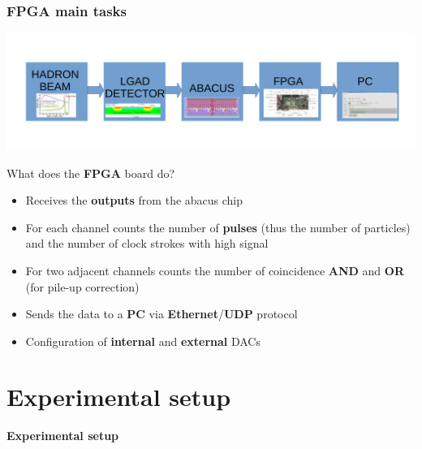 \documentclass[aspectratio=169]{beamer}
\begin{document}
\begin{frame}
	\frametitle{FPGA main tasks}
	\vspace*{-2.7mm}
	\begin{center}
		\includegraphics[width=0.85 \textwidth]{IMG/Block_Diagram.pdf}
	\end{center}
	\vspace*{-5mm}
	\begin{center}
		{\Large \color{blue} What does the \textbf{FPGA} board do?}\\[3mm]
		\begin{itemize}
			\item Receives the \textbf{outputs} from the abacus chip
			\item For each channel counts the number of \textbf{pulses} (thus the number of particles) and the number of clock strokes with high signal
			\item For two adjacent channels counts the number of coincidence \textbf{AND} and \textbf{OR} (for pile-up correction)
			\item Sends the data to a \textbf{PC} via \textbf{Ethernet}/\textbf{UDP} protocol
			\item Configuration of \textbf{internal} and \textbf{external} DACs
		\end{itemize}
	\end{center}
\end{frame}

	
\section{Experimental setup}

\begin{frame}
\begin{center}
	{\Huge {}\selectfont \color{blue} \textbf{Experimental setup}}
\end{center}
\end{frame}
\end{document}
